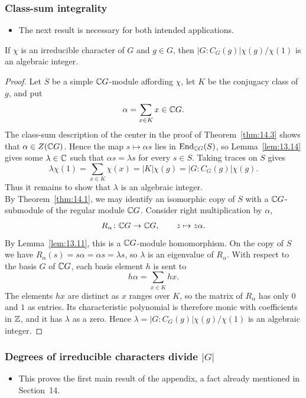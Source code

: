 \documentclass[../Odyssey_Project.tex]{subfiles}
\begin{document}
\subsubsection*{Class-sum integrality}
\begin{itemize}
    \item The next result is necessary for both intended applications.
\end{itemize}

\begin{lemma}
\label{lem:17.4}
If $\chi$ is an irreducible character of $G$ and $g \in G$, then $|G : C_G(g)|\chi(g)/\chi(1)$ is an algebraic integer.
\end{lemma}
\begin{proof}
    Let $S$ be a simple $\mathbb{C} G$-module affording $\chi$, let $K$ be the conjugacy class of $g$, and put
    \[
        \alpha=\sum_{x\in K}x\in\mathbb{C} G.
    \]
    The class-sum description of the center in the proof of Theorem~\ref{thm:14.3} shows that $\alpha\in Z(\mathbb{C} G)$. Hence the map $s\mapsto\alpha s$ lies in $\operatorname{End}_{\mathbb{C} G}(S)$, so Lemma~\ref{lem:13.14} gives some $\lambda\in\mathbb{C}$ such that $\alpha s=\lambda s$ for every $s\in S$. Taking traces on $S$ gives
    \[
        \lambda\chi(1)
        =\sum_{x\in K}\chi(x)
        =|K|\chi(g)
        =|G:C_G(g)|\chi(g).
    \]
    Thus it remains to show that $\lambda$ is an algebraic integer.\\
    By Theorem~\ref{thm:14.1}, we may identify an isomorphic copy of $S$ with a $\mathbb{C} G$-submodule of the regular module $\mathbb{C} G$. Consider right multiplication by $\alpha$,
    \[
        R_\alpha\colon\mathbb{C} G\to\mathbb{C} G,\qquad z\mapsto z\alpha.
    \]
    By Lemma~\ref{lem:13.11}, this is a $\mathbb{C} G$-module homomorphism. On the copy of $S$ we have $R_\alpha(s)=s\alpha=\alpha s=\lambda s$, so $\lambda$ is an eigenvalue of $R_\alpha$. With respect to the basis $G$ of $\mathbb{C} G$, each basis element $h$ is sent to
    \[
        h\alpha=\sum_{x\in K}hx.
    \]
    The elements $hx$ are distinct as $x$ ranges over $K$, so the matrix of $R_\alpha$ has only $0$ and $1$ as entries. Its characteristic polynomial is therefore monic with coefficients in $\mathbb{Z}$, and it has $\lambda$ as a zero. Hence $\lambda=|G:C_G(g)|\chi(g)/\chi(1)$ is an algebraic integer.
\end{proof}

\subsubsection*{Degrees of irreducible characters divide \texorpdfstring{$|G|$}{|G|}}
\begin{itemize}
    \item This proves the first main result of the appendix, a fact already mentioned in Section~14.
\end{itemize}
\end{document}
